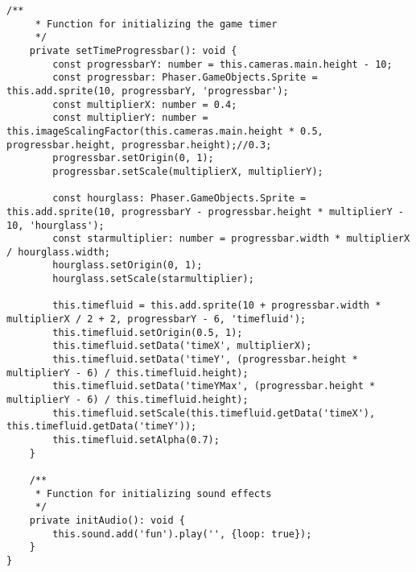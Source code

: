 \begin{lstlisting}[style=TypeScript, caption={gameScene.ts}]
    /**
     * Function for initializing the game timer
     */
    private setTimeProgressbar(): void {
        const progressbarY: number = this.cameras.main.height - 10;
        const progressbar: Phaser.GameObjects.Sprite = this.add.sprite(10, progressbarY, 'progressbar');
        const multiplierX: number = 0.4;
        const multiplierY: number = this.imageScalingFactor(this.cameras.main.height * 0.5, progressbar.height, progressbar.height);//0.3;
        progressbar.setOrigin(0, 1);
        progressbar.setScale(multiplierX, multiplierY);

        const hourglass: Phaser.GameObjects.Sprite = this.add.sprite(10, progressbarY - progressbar.height * multiplierY - 10, 'hourglass');
        const starmultiplier: number = progressbar.width * multiplierX / hourglass.width;
        hourglass.setOrigin(0, 1);
        hourglass.setScale(starmultiplier);

        this.timefluid = this.add.sprite(10 + progressbar.width * multiplierX / 2 + 2, progressbarY - 6, 'timefluid');
        this.timefluid.setOrigin(0.5, 1);
        this.timefluid.setData('timeX', multiplierX);
        this.timefluid.setData('timeY', (progressbar.height * multiplierY - 6) / this.timefluid.height);
        this.timefluid.setData('timeYMax', (progressbar.height * multiplierY - 6) / this.timefluid.height);
        this.timefluid.setScale(this.timefluid.getData('timeX'), this.timefluid.getData('timeY'));
        this.timefluid.setAlpha(0.7);
    }

    /**
     * Function for initializing sound effects
     */
    private initAudio(): void {
        this.sound.add('fun').play('', {loop: true});
    }
}
\end{lstlisting}

